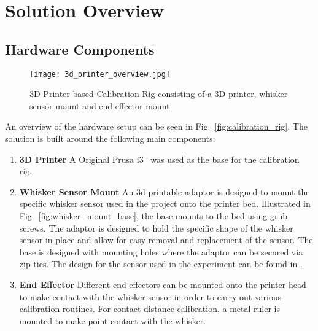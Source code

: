 \documentclass[runningheads]{llncs}
\begin{document}
\section{Solution Overview}

\subsection{Hardware Components}

\begin{wrapfigure}{r}{0.4\textwidth}
    \centering
    \texttt{[image: 3d\_printer\_overview.jpg]}
    \caption{3D Printer based Calibration Rig consisting of a 3D printer, whisker sensor mount and end effector mount.}
    \vspace{-5pt}
    \label{fig:calibration_rig_overview}
\end{wrapfigure}

An overview of the hardware setup can be seen in Fig.~\ref{fig:calibration_rig}. The solution is built around the following main components:

\begin{enumerate}
    \item \textbf{3D Printer} A Original Prusa i3~\cite{OriginalPrusaI3} was used as the base for the calibration rig.
    \item \textbf{Whisker Sensor Mount} An 3d printable adaptor is designed to mount the specific whisker sensor used in the project onto the printer bed. Illustrated in Fig.~\ref{fig:whisker_mount_base}, the base mounts to the bed using grub screws. The adaptor is designed to hold the specific shape of the whisker sensor in place and allow for easy removal and replacement of the sensor. The base is designed with mounting holes where the adaptor can be secured via zip ties. The design for the sensor used in the experiment can be found in \cite{FoRGroup1OpenWhisker2024}.
    \item \textbf{End Effector} Different end effectors can be mounted onto the printer head to make contact with the whisker sensor in order to carry out various calibration routines. For contact distance calibration, a metal ruler is mounted to make point contact with the whisker.
\end{enumerate}
\end{document}
